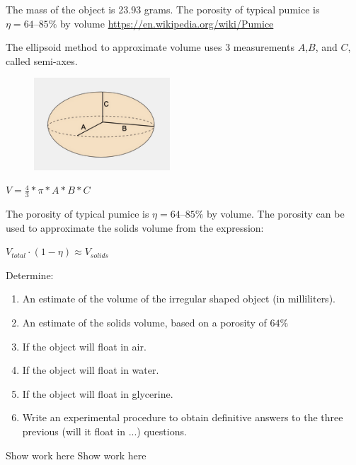 \documentclass[12pt]{article}
\begin{document}
The mass of the object is 23.93 grams. The porosity of typical pumice is
\(\eta = 64–85\%\) by volume
\url{https://en.wikipedia.org/wiki/Pumice}

The ellipsoid method to approximate volume uses 3 measurements
\(A\),\(B\), and \(C\), called semi-axes.

\begin{figure}[htbp] %
\centering
\includegraphics[width=2in]{ellipsoid.png}
\end{figure}

\(V = \frac{4}{3} * \pi * A * B * C\)

The porosity of typical pumice is \(\eta = 64–85\%\) by volume. The porosity can
be used to approximate the solids volume from the expression:

\(V_{total} \cdot (1-\eta) \approx V_{solids}\)

Determine: 
\begin{enumerate}
\item An estimate of the volume of the irregular shaped object (in milliliters). 
\item An estimate of the solids volume, based on a porosity of \(64\%\) 
\item If the object will float in air.
\item If the object will float in water.
\item If the object will float in glycerine.
\item Write an experimental procedure to obtain definitive answers to the three previous (will it float in ...) questions.  
\end{enumerate}
\clearpage
Show work here
\clearpage
Show work here
\end{document}
